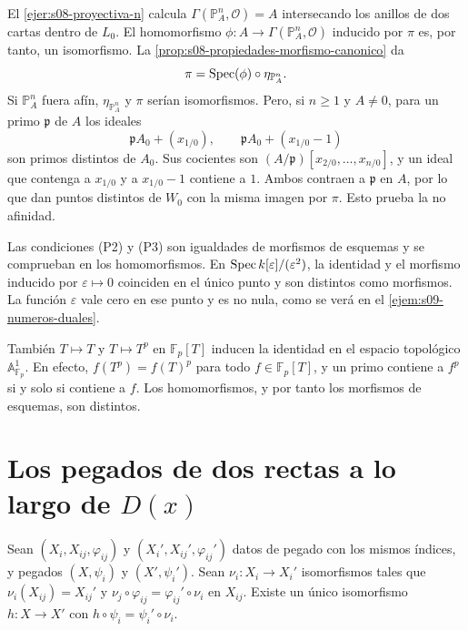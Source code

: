 \begin{obs}
\label{obs:s08-proyectiva-n-no-afin}
El \cref{ejer:s08-proyectiva-n} calcula $\Gamma(\mathbb P^n_A,\mathcal O)=A$ intersecando los anillos de dos cartas dentro de $L_0$. El homomorfismo $\phi\colon A\to\Gamma(\mathbb P^n_A,\mathcal O)$ inducido por $\pi$ es, por tanto, un isomorfismo. La \cref{prop:s08-propiedades-morfismo-canonico} da
\[
\pi=\operatorname{Spec}(\phi)\circ\eta_{\mathbb P^n_A}.
\]
Si $\mathbb P^n_A$ fuera afín, $\eta_{\mathbb P^n_A}$ y $\pi$ serían isomorfismos. Pero, si $n\ge1$ y $A\ne0$, para un primo $\mathfrak p$ de $A$ los ideales
\[
\mathfrak pA_0+(x_{1/0}),\qquad
\mathfrak pA_0+(x_{1/0}-1)
\]
son primos distintos de $A_0$. Sus cocientes son $(A/\mathfrak p)[x_{2/0},\ldots,x_{n/0}]$, y un ideal que contenga a $x_{1/0}$ y a $x_{1/0}-1$ contiene a $1$. Ambos contraen a $\mathfrak p$ en $A$, por lo que dan puntos distintos de $W_0$ con la misma imagen por $\pi$. Esto prueba la no afinidad.
\end{obs}

\begin{obs}
\label{obs:s08-cuentas-en-anillos}
Las condiciones (P2) y (P3) son igualdades de morfismos de esquemas y se comprueban en los homomorfismos. En $\operatorname{Spec} k[\varepsilon]/(\varepsilon^2)$, la identidad y el morfismo inducido por $\varepsilon\mapsto0$ coinciden en el único punto y son distintos como morfismos. La función $\varepsilon$ vale cero en ese punto y es no nula, como se verá en el \cref{ejem:s09-numeros-duales}.

También $T\mapsto T$ y $T\mapsto T^p$ en $\mathbb F_p[T]$ inducen la identidad en el espacio topológico $\mathbb A^1_{\mathbb F_p}$. En efecto, $f(T^p)=f(T)^p$ para todo $f\in\mathbb F_p[T]$, y un primo contiene a $f^p$ si y solo si contiene a $f$. Los homomorfismos, y por tanto los morfismos de esquemas, son distintos.
\end{obs}

\section{Los pegados de dos rectas a lo largo de \texorpdfstring{$D(x)$}{D(x)}}
\label{sec:s08-dos-rectas}

\begin{lema}
\label{lema:s08-funtorialidad-pegado}
Sean $(X_i,X_{ij},\varphi_{ij})$ y $(X_i',X_{ij}',\varphi_{ij}')$ datos de pegado con los mismos índices, y pegados $(X,\psi_i)$ y $(X',\psi_i')$. Sean $\nu_i\colon X_i\to X_i'$ isomorfismos tales que $\nu_i(X_{ij})=X_{ij}'$ y $\nu_j\circ\varphi_{ij}=\varphi_{ij}'\circ\nu_i$ en $X_{ij}$. Existe un único isomorfismo $h\colon X\to X'$ con $h\circ\psi_i=\psi_i'\circ\nu_i$.
\end{lema}

